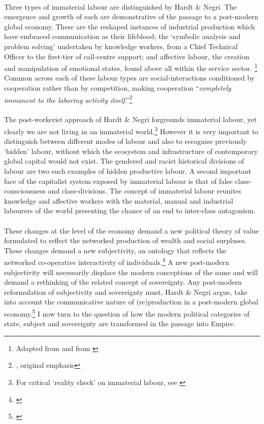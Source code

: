 \documentclass[12pt,a4paper,titlepage]{article}
\begin{document}
\paragraph{}Three types of immaterial labour are distinguished by Hardt \& Negri. The emergence and growth of each are demonstrative of the passage to a post-modern global economy. These are the reshaped instances of industrial production which have embraced communication as their lifeblood; the ‘symbolic analysis and problem solving’ undertaken by knowledge workers, from a Chief Technical Officer to the first-tier of call-centre support; and affective labour, the creation and manipulation of emotional states, found above all within the service sector. \footnote{Adapted from \cite[p. 2]{Wright:2005wb} and from  \cite[p. 30 \& p. 293]{Hardt:2001jl}} Common across each of these labour types are social-interactions conditioned by cooperation rather than by competition, making cooperation ``\textit{completely immanent to the laboring activity itself}.''\footnote{\cite[p. 294]{Hardt:2001jl}, original emphasis}

\paragraph{}The post-workerist approach of Hardt \& Negri forgrounds immaterial labour, yet clearly we are not living in an immaterial world.\footnote{For critical `reality check' on immaterial labour, see \cite{Wright:2005wb}} However it is very important to distinguish between different modes of labour and also to recognise previously `hidden' labour, without which the ecosystem and infrastructure of contemporary global capital would not exist. The gendered and racist historical divisions of labour are two such examples of hidden productive labour. A second important face of the capitalist system exposed by immaterial labour is that of false class-consciousness and class-divisions. The concept of immaterial labour reunites knowledge and affective workers with the material, manual and industrial labourers of the world presenting the chance of an end to inter-class antagonism.

\paragraph{}These changes at the level of the economy demand a new political theory of value formulated to reflect the networked production of wealth and social surpluses. These changes demand a new subjectivity, an ontology that reflects the networked co-operative interactivity of individuals.\footnote{\cite[p. 29 \& p.294]{Hardt:2001jl}} A new post-modern subjectivity will necessarily displace the modern conceptions of the same and will demand a rethinking of the related concept of sovereignty. Any post-modern reformulation of subjectivity and sovereignty must, Hardt \& Negri argue, take into account the communicative nature of (re)production in a post-modern global economy.\footnote{\cite[p. 34]{Hardt:2001jl}} I now turn to the question of how the modern political categories of state, subject and sovereignty are transformed in the passage into Empire.
\end{document}
